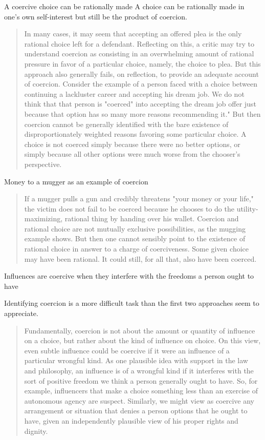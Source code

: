 A coercive choice can be rationally made
A choice can be rationally made in one's own self-interest but still be the product of coercion.

\begin{quote}
    In many cases, it may seem that accepting an offered plea is the only rational choice left for a defendant. Reflecting on this, a critic may try to understand coercion as consisting in an overwhelming amount of rational pressure in favor of a particular choice, namely, the choice to plea. But this approach also generally fails, on reflection, to provide an adequate account of coercion. Consider the example of a person faced with a choice between continuing a lackluster career and accepting his dream job. We do not think that that person is "coerced" into accepting the dream job offer just because that option has so many more reasons recommending it." But then coercion cannot be generally identified with the bare existence of disproportionately weighted reasons favoring some particular choice. A choice is not coerced simply because there were no better options, or simply because all other options were much worse from the chooser's perspective.
\end{quote}

Money to a mugger as an example of coercion

\begin{quote}
    If a mugger pulls a gun and credibly threatens "your money or your life," the victim does not fail to be coerced because he chooses to do the utility-maximizing, rational thing by handing over his wallet. Coercion and rational choice are not mutually exclusive possibilities, as the mugging example shows. But then one cannot sensibly point to the existence of rational choice in answer to a charge of coerciveness. Some given choice may have been rational. It could still, for all that, also have been coerced.
\end{quote}

Influences are coercive when they interfere with the freedoms a person ought to have

Identifying coercion is a more difficult task than the first two approaches seem to appreciate.
\begin{quote}
    Fundamentally, coercion is not about the amount or quantity of influence on a choice, but rather about the kind of influence on choice. On this view, even subtle influence could be coercive if it were an influence of a particular wrongful kind. As one plausible idea with support in the law and philosophy, an influence is of a wrongful kind if it interferes with the sort of positive freedom we think a person generally ought to have. So, for example, influencers that make a choice something less than an exercise of autonomous agency are suspect. Similarly, we might view as coercive any arrangement or situation that denies a person options that he ought to have, given an independently plausible view of his proper rights and dignity.
\end{quote}

